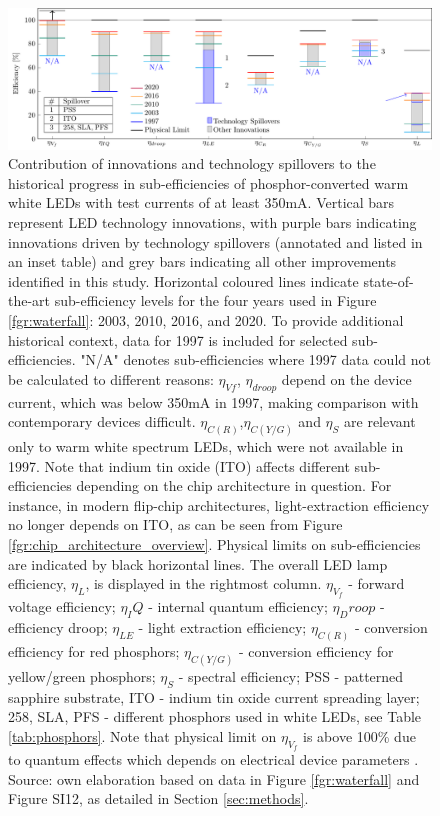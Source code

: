 \documentclass[journal=jacsat,manuscript=article]{achemso}
\begin{document}
\begin{figure}[h!]
 \centering
 \includegraphics[width=\textwidth]{2_SSL_EST/article/figures/breakthroughs_efficiency.pdf}
 \caption{Contribution of innovations and technology spillovers to the historical progress in sub-efficiencies of phosphor-converted warm white LEDs with test currents of at least 350mA. Vertical bars represent LED technology innovations, with purple bars indicating innovations driven by technology spillovers (annotated and listed in an inset table) and grey bars indicating all other improvements identified in this study. Horizontal coloured lines indicate state-of-the-art sub-efficiency levels for the four years used in Figure \ref{fgr:waterfall}: 2003, 2010, 2016, and 2020. To provide additional historical context, data for 1997 is included for selected sub-efficiencies. "N/A" denotes sub-efficiencies where 1997 data could not be calculated to different reasons: $\eta_{Vf}$, $\eta_{droop}$ depend on the device current, which was below 350mA in 1997, making comparison with contemporary devices difficult. $\eta_{C(R)}$,$\eta_{C(Y/G)}$ and $\eta_S$ are relevant only to warm white spectrum LEDs, which were not available in 1997. Note that indium tin oxide (ITO) affects different sub-efficiencies depending on the chip architecture in question. For instance, in modern flip-chip architectures, light-extraction efficiency no longer depends on ITO, as can be seen from Figure \ref{fgr:chip_architecture_overview}. Physical limits on sub-efficiencies are indicated by black horizontal lines. The overall LED lamp efficiency, $\eta_L$, is displayed in the rightmost column. $\eta_{V_f}$ - forward voltage efficiency; $\eta_IQ$ - internal quantum efficiency; $\eta_Droop$ - efficiency droop; $\eta_{LE}$ - light extraction efficiency; $\eta_{C(R)}$ - conversion efficiency for red phosphors; $\eta_{C(Y/G)}$ - conversion efficiency for yellow/green phosphors; $\eta_S$ - spectral efficiency; PSS - patterned sapphire substrate, ITO - indium tin oxide current spreading layer; 258, SLA, PFS - different phosphors used in white LEDs, see Table \ref{tab:phosphors}.  Note that physical limit on $\eta_{V_f}$ is above 100\% due to quantum effects which depends on electrical device parameters \cite{david2016electrical}. Source: own elaboration based on data in Figure \ref{fgr:waterfall} and Figure SI12, as detailed in Section \ref{sec:methods}.}
 \label{fgr:breakthroughs_efficiency}
\end{figure}
\end{document}
